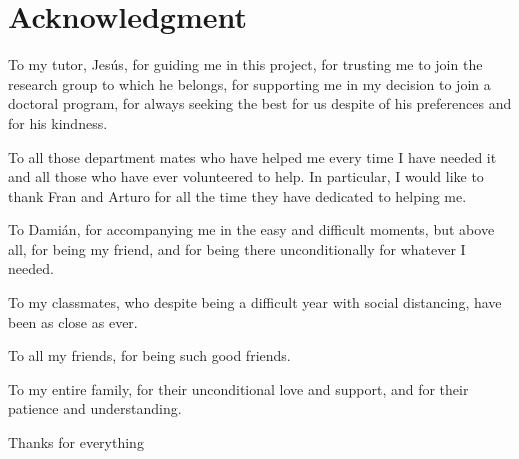 \chapter*{Acknowledgment}
\pagestyle{empty}

\lettrine[lraise=-0.1, lines=2, loversize=0.25]{}{}
To my tutor, Jesús, for guiding me in this project, for trusting me to join the research group to which he belongs, for supporting me in my decision to join a doctoral program, for always seeking the best for us despite of his preferences and for his kindness. 

To all those department mates who have helped me every time I have needed it and all those who have ever volunteered to help. In particular, I would like to thank Fran and Arturo for all the time they have dedicated to helping me. 

To Damián, for accompanying me in the easy and difficult moments, but above all, for being my friend, and for being there unconditionally for whatever I needed. 

To my classmates, who despite being a difficult year with social distancing, have been as close as ever.

To all my friends, for being such good friends. 

To my entire family, for their unconditional love and support, and for their patience and understanding. 

\vspace{1.3cm}
Thanks for everything
{}%
{}%
